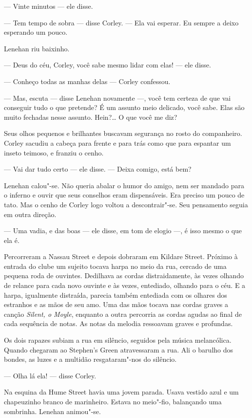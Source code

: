--- Vinte minutos --- ele disse.

--- Tem tempo de sobra --- disse Corley.  --- Ela vai esperar.  Eu sempre a
deixo esperando um pouco.

Lenehan riu baixinho.

--- Deus do céu, Corley, você sabe mesmo lidar com elas! --- ele disse.

--- Conheço todas as manhas delas --- Corley confessou.

--- Mas, escuta --- disse Lenehan novamente ---, você tem certeza de que vai
conseguir tudo o que pretende?  É um assunto meio delicado, você sabe.  Elas
são muito fechadas nesse assunto.  Hein?\ldots{} O que você me diz?

Seus olhos pequenos e brilhantes buscavam segurança no rosto do companheiro.
Corley sacudiu a cabeça para frente e para trás como que para espantar um
inseto teimoso, e franziu o cenho.

--- Vai dar tudo certo --- ele disse.  --- Deixa comigo, está bem?

Lenehan calou"-se.  Não queria abalar o humor do amigo, nem ser mandado para o
inferno e ouvir que seus conselhos eram dispensáveis.  Era preciso um pouco de
tato.  Mas o cenho de Corley logo voltou a descontrair"-se.  Seu pensamento
seguia em outra direção.

--- Uma vadia, e das boas --- ele disse, em tom de elogio ---, é isso mesmo o
que ela é.

Percorreram a Nassau Street e depois dobraram em Kildare Street.  Próximo à
entrada do clube um sujeito tocava harpa no meio da rua, cercado de uma pequena
roda de ouvintes.  Dedilhava as cordas distraidamente, às vezes olhando de
relance para cada novo ouvinte e às vezes, entediado, olhando para o céu.  E a
harpa, igualmente distraída, parecia também entediada com os olhares dos
estranhos e as mãos de seu amo.  Uma das mãos tocava nas cordas graves a canção
\textit{Silent, o Moyle}, enquanto a outra percorria as cordas agudas ao final
de cada sequência de notas.  As notas da melodia ressoavam graves e profundas.

Os dois rapazes subiam a rua em silêncio, seguidos pela música melancólica.
Quando chegaram ao Stephen’s Green atravessaram a rua.  Ali o barulho dos
bondes, as luzes e a multidão resgataram"-nos do silêncio.

--- Olha lá ela! --- disse Corley.

Na esquina da Hume Street havia uma jovem parada.  Usava vestido azul e um
chapeuzinho branco de marinheiro.  Estava no meio"-fio, balançando uma
sombrinha.  Lenehan animou"-se.

